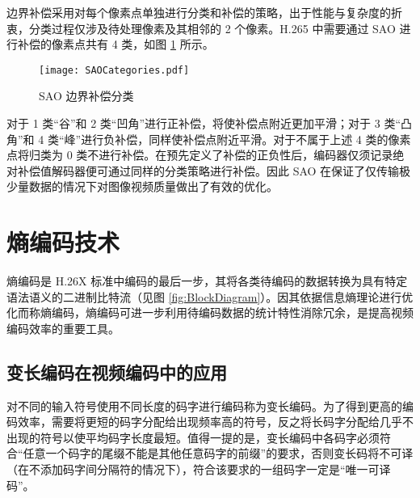 边界补偿采用对每个像素点单独进行分类和补偿的策略，出于性能与复杂度的折衷，分类过程仅涉及待处理像素及其相邻的 2 个像素。H.265 中需要通过 SAO 进行补偿的像素点共有 4 类，如图 \ref{fig:SAOCategories} 所示。
\begin{figure}[hbt]
    \centering
    \texttt{[image: SAOCategories.pdf]}
    \caption{SAO 边界补偿分类}
    \label{fig:SAOCategories}
\end{figure}

对于 1 类“谷”和 2 类“凹角”进行正补偿，将使补偿点附近更加平滑；对于 3 类“凸角”和 4 类“峰”进行负补偿，同样使补偿点附近平滑。对于不属于上述 4 类的像素点将归类为 0 类不进行补偿。在预先定义了补偿的正负性后，编码器仅须记录绝对补偿值解码器便可通过同样的分类策略进行补偿。因此 SAO 在保证了仅传输极少量数据的情况下对图像视频质量做出了有效的优化。

\section{熵编码技术}
熵编码是 H.26X 标准中编码的最后一步，其将各类待编码的数据转换为具有特定语法语义的二进制比特流（见图 \ref{fig:BlockDiagram}）。因其依据信息熵理论进行优化而称熵编码，熵编码可进一步利用待编码数据的统计特性消除冗余，是提高视频编码效率的重要工具。

\subsection{变长编码在视频编码中的应用}
对不同的输入符号使用不同长度的码字进行编码称为变长编码。为了得到更高的编码效率，需要将更短的码字分配给出现频率高的符号，反之将长码字分配给几乎不出现的符号以使平均码字长度最短。值得一提的是，变长编码中各码字必须符合“任意一个码字的尾缀不能是其他任意码字的前缀”的要求，否则变长码将不可译（在不添加码字间分隔符的情况下），符合该要求的一组码字一定是“唯一可译码”。

